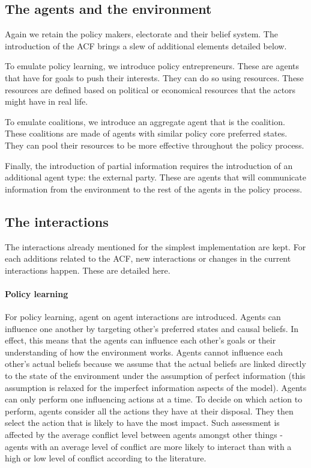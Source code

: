 \documentclass[11pt]{article}
\begin{document}

\subsection{The agents and the environment}

Again we retain the policy makers, electorate and their belief system. The introduction of the ACF brings a slew of additional elements detailed below.

To emulate policy learning, we introduce policy entrepreneurs. These are agents that have for goals to push their interests. They can do so using resources. These resources are defined based on political or economical resources that the actors might have in real life.

To emulate coalitions, we introduce an aggregate agent that is the coalition. These coalitions are made of agents with similar policy core preferred states. They can pool their resources to be more effective throughout the policy process.

Finally, the introduction of partial information requires the introduction of an additional agent type: the external party. These are agents that will communicate information from the environment to the rest of the agents in the policy process.


\subsection{The interactions}

The interactions already mentioned for the simplest implementation are kept. For each additions related to the ACF, new interactions or changes in the current interactions happen. These are detailed here.

\paragraph{Policy learning}

For policy learning, agent on agent interactions are introduced. Agents can influence one another by targeting other's preferred states and causal beliefs. In effect, this means that the agents can influence each other's goals or their understanding of how the environment works. Agents cannot influence each other's actual beliefs because we assume that the actual beliefs are linked directly to the state of the environment under the assumption of perfect information (this assumption is relaxed for the imperfect information aspects of the model). Agents can only perform one influencing actions at a time. To decide on which action to perform, agents consider all the actions they have at their disposal. They then select the action that is likely to have the most impact. Such assessment is affected by the average conflict level between agents amongst other things - agents with an average level of conflict are more likely to interact than with a high or low level of conflict according to the literature.
\end{document}
